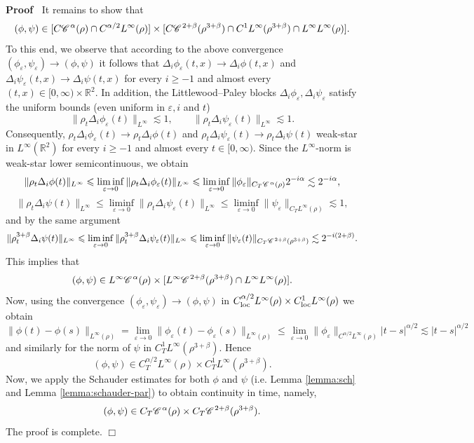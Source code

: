 \documentclass[a4paper,11pt]{article}
\renewcommand{\geq}{\geqslant}
\newenvironment{proof}{\noindent\textbf{Proof\ }}{\hspace*{\fill}$\Box$\medskip}
\numberwithin{equation}{section}
\newcommand{\CC}{\mathscr{C} \hspace{.1em}}
\newcommand{\R}{\mathbb{R}}
\newcommand{\8}{\infty}
\begin{document}
\begin{proof}
It remains to show that
$$(\phi,\psi)\in [C\CC^{\alpha}(\rho)\cap C^{\alpha/2}L^{\infty}(\rho)] \times[C\CC^{2+\beta}(\rho^{3+\beta})\cap C^{1}L^{\infty}(\rho^{3+\beta})\cap L^{\infty}L^{\infty}(\rho)].$$
To this end, we observe that according to the above convergence $(\phi_{\varepsilon},\psi_{\varepsilon})\to (\phi,\psi)$ it follows that $\Delta_{i}\phi_{\varepsilon}(t,x)\to \Delta_{i}\phi(t,x)$ and $\Delta_{i}\psi_{\varepsilon}(t,x)\to \Delta_{i}\psi(t,x)$ for every $i\geq -1$ and almost every $(t,x)\in [0,\8)\times\R^{2}$. In addition, the Littlewood--Paley blocks $\Delta_{i}\phi_{\varepsilon}, \Delta_{i}\psi_{\varepsilon}$ satisfy the uniform  bounds (even uniform in $\varepsilon,i$ and $t$)
$$
\|\rho_{t}\Delta_{i}\phi_{\varepsilon}(t)\|_{L^{\infty}}\lesssim 1,\qquad \|\rho_{t}\Delta_{i}\psi_{\varepsilon}(t)\|_{L^{\infty}}\lesssim 1.
$$
Consequently,  $\rho_{t}\Delta_{i}\phi_{\varepsilon}(t)\to \rho_{t}\Delta_{i}\phi(t)$ and $\rho_{t}\Delta_{i}\psi_{\varepsilon}(t)\to \rho_{t}\Delta_{i}\psi(t)$  weak-star in $L^{\infty}(\R^{2})$ for every $i\geq -1$ and almost every $t\in [0,\8)$. Since the $L^{\infty}$-norm is weak-star lower semicontinuous, we obtain
$$
\|\rho_{t}\Delta_{i}\phi(t)\|_{L^{\infty}}\leqslant \liminf_{\varepsilon\to 0}\|\rho_{t}\Delta_{i}\phi_{\varepsilon}(t)\|_{L^{\infty}}\leqslant \liminf_{\varepsilon\to 0}\|\phi_{\varepsilon}\|_{C_{T}\CC^{\alpha}(\rho)}2^{-i\alpha}\lesssim 2^{-i\alpha},
$$
$$
\|\rho_{t}\Delta_{i}\psi(t)\|_{L^{\infty}}\leqslant \liminf_{\varepsilon\to 0}\|\rho_{t}\Delta_{i}\psi_{\varepsilon}(t)\|_{L^{\infty}}\leqslant \liminf_{\varepsilon\to 0}\|\psi_{\varepsilon}\|_{C_{T}L^{\infty}(\rho)}\lesssim 1,
$$
and by the same argument
$$
\|\rho_{t}^{3+\beta}\Delta_{i}\psi(t)\|_{L^{\infty}}\leqslant \liminf_{\varepsilon\to 0}\|\rho_{t}^{3+\beta}\Delta_{i}\psi_{\varepsilon}(t)\|_{L^{\infty}}\leqslant \liminf_{\varepsilon\to 0}\|\psi_{\varepsilon}(t)\|_{C_{T}\CC^{2+\beta}(\rho^{3+\beta})}\lesssim 2^{-i(2+\beta)}.
$$
This implies that
$$(\phi,\psi)\in L^{\infty}\CC^{\alpha}(\rho) \times[L^{\infty}\CC^{2+\beta}(\rho^{3+\beta})\cap  L^{\infty}L^{\infty}(\rho)].$$
Now, using the convergence $(\phi_{\varepsilon},\psi_{\varepsilon})\to (\phi,\psi)$ in $C_{ \rm{loc}}^{\alpha/2}L^{\infty}(\rho)\times C^{1}_{ \rm{loc}}L^{\infty}(\rho)$ we obtain
$$
\|\phi(t)-\phi(s)\|_{L^{\infty}(\rho)}=\lim_{\varepsilon\to 0}\|\phi_{\varepsilon}(t)-\phi_{\varepsilon}(s)\|_{L^{\infty}(\rho)}\leqslant \lim_{\varepsilon\to 0}\|\phi_{\varepsilon}\|_{C^{\alpha/2}L^{\infty}(\rho)}|t-s|^{\alpha/2}\lesssim |t-s|^{\alpha/2}
$$
and similarly for the norm of $\psi$ in $C^{1}_{T}L^{\infty}(\rho^{3+\beta}).$ Hence
$$(\phi,\psi)\in C^{\alpha/2}_{T}L^{\infty}(\rho) \times C^{1}_{T}L^{\infty}(\rho^{{3+\beta}}).$$
Now,  we apply the Schauder estimates for both $\phi$ and $\psi$ (i.e. Lemma \ref{lemma:sch} and Lemma \ref{lemma:schauder-par}) to obtain continuity in time, namely,
$$
(\phi,\psi)\in C_{T}\CC^{\alpha}(\rho)\times C_{T}\CC^{2+\beta}(\rho^{3+\beta}).
$$
The proof is complete.
\end{proof}
\end{document}
